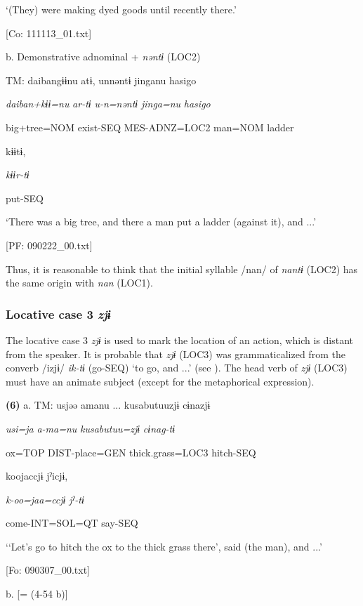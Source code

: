       ‘(They) were making dyed goods until recently there.’

      [Co: 111113\_01.txt]

  b.  Demonstrative adnominal + \textit{nəntɨ} (LOC2)

    TM:  daibangɨɨnu  atɨ,  unnəntɨ  jinganu  {\textbar}hasigo{\textbar}

      \textit{daiban+kɨɨ=nu}  \textit{ar-tɨ}  \textit{u-n=nəntɨ}  \textit{jinga=nu}  \textit{hasigo}

      big+tree=NOM  exist-SEQ  MES-ADNZ=LOC2  man=NOM  ladder

      kɨɨtɨ,

      \textit{kɨɨr-tɨ}

      put-SEQ

      ‘There was a big tree, and there a man put a ladder (against it), and ...’

      [PF: 090222\_00.txt]

Thus, it is reasonable to think that the initial syllable /nan/ of \textit{nantɨ} (LOC2) has the same origin with \textit{nan} (LOC1).

\subsubsection{Locative case 3 \textit{zjɨ}}

The locative case 3 \textit{zjɨ} is used to mark the location of an action, which is distant from the speaker. It is probable that \textit{zjɨ} (LOC3) was grammaticalized from the converb /izjɨ/ \textit{ik-tɨ} (go-SEQ) ‘to go, and ...’ (see ). The head verb of \textit{zjɨ} (LOC3) must have an animate subject (except for the metaphorical expression).

\textbf{(6)}  a.  TM:  usjəə  amanu ...  kusabutuuzjɨ  cɨnazjɨ

      \textit{usi=ja}  \textit{a-ma=nu}  \textit{kusabutuu=zjɨ}  \textit{cɨnag-tɨ}

      ox=TOP  DIST-place=GEN  thick.grass=LOC3  hitch-SEQ

      koojaccjɨ  jˀicjɨ,

      \textit{k-oo=jaa=ccjɨ}  \textit{jˀ-tɨ}

      come-INT=SOL=QT  say-SEQ

      ‘‘Let’s go to hitch the ox to the thick grass there’, said (the man), and ...’

      [Fo: 090307\_00.txt]

  b.  [= (4-54 b)]


